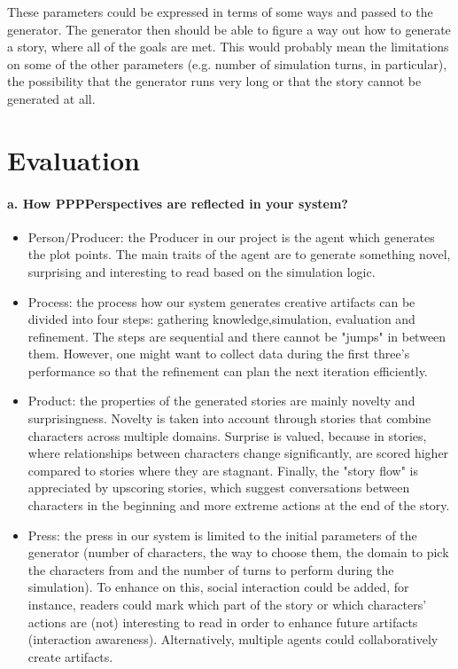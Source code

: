 \documentclass[english]{tktltiki}
\begin{document}
    These parameters could be expressed in terms of some ways and passed to the generator. The generator then should be able to figure a way out how to generate a story, where all of the goals are met. This would probably mean the limitations on some of the other parameters (e.g. number of simulation turns, in particular), the possibility that the generator runs very long or that the story cannot be generated at all.

    \pagebreak
    \section{Evaluation}
    
    \paragraph{a. How PPPPerspectives are reflected in your system?}

    \begin{itemize}
        \item Person/Producer: the Producer in our project is the agent which generates the plot points. The main traits of the agent are to generate something novel, surprising and interesting to read based on the simulation logic. 
        \item Process: the process how our system generates creative artifacts can be divided into four steps: gathering knowledge,simulation, evaluation and refinement. The steps are sequential and there cannot be "jumps" in between them. However, one might want to collect data during the first three's performance so that the refinement can plan the next iteration efficiently. 
        \item Product: the properties of the generated stories are mainly novelty and surprisingness. Novelty is taken into account through stories that combine characters across multiple domains. Surprise is valued, because in stories, where relationships between characters change significantly, are scored higher compared to stories where they are stagnant. Finally, the "story flow" is appreciated by upscoring stories, which suggest conversations between characters in the beginning and more extreme actions at the end of the story.
        \item Press: the press in our system is limited to the initial parameters of the generator (number of characters, the way to choose them, the domain to pick the characters from and the number of turns to perform during the simulation). To enhance on this, social interaction could be added, for instance, readers could mark which part of the story or which characters' actions are (not) interesting to read in order to enhance future artifacts (interaction awareness). Alternatively, multiple agents could collaboratively create artifacts. 
    \end{itemize}
    
\end{document}
